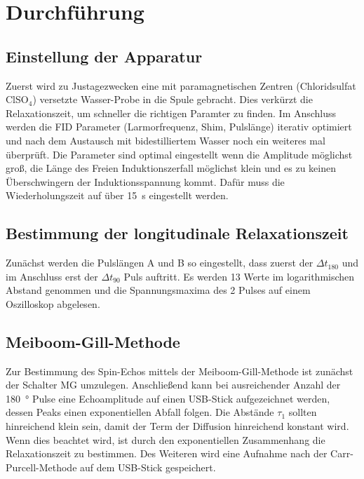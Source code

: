 \section{Durchführung}%
\label{sec:durchfuehrung}

\subsection{Einstellung der Apparatur}%
\label{sub:einstellung_der_apparatur}

Zuerst wird zu Justagezwecken eine mit paramagnetischen Zentren (Chloridsulfat
ClSO$_4$) versetzte Wasser-Probe in die Spule gebracht.
Dies verkürzt die Relaxationszeit, um schneller die richtigen Paramter zu finden. 
Im Anschluss werden die FID Parameter (Larmorfrequenz, Shim, Pulslänge) iterativ optimiert und nach dem Austausch
mit bidestilliertem Wasser noch ein weiteres mal überprüft. 
Die Parameter sind optimal eingestellt wenn die Amplitude möglichst groß, die
Länge des Freien Induktionszerfall möglichst klein und es zu keinen
Überschwingern der Induktionsspannung kommt.
Dafür muss die Wiederholungszeit auf über \SI{15}{\second} eingestellt werden.

\subsection{Bestimmung der longitudinale Relaxationszeit}%
\label{sub:bestimmung_der_longitudinale_relaxationszeit}
Zunächst werden die Pulslängen A und B so eingestellt, dass zuerst der 
$\Delta t_{180}$ und im Anschluss erst der $\Delta t_{90}$ Puls auftritt. 
Es werden 13 Werte im logarithmischen Abstand genommen und die
Spannungsmaxima des 2 Pulses auf einem Oszilloskop abgelesen.

\subsection{Meiboom-Gill-Methode}%
\label{sub:meiboom_gill_methode}
Zur Bestimmung des Spin-Echos mittels der Meiboom-Gill-Methode ist zunächst der
Schalter MG umzulegen. Anschließend kann bei ausreichender Anzahl der \SI{180}{\degree}
Pulse eine Echoamplitude auf einen USB-Stick aufgezeichnet werden, dessen Peaks einen
exponentiellen Abfall folgen. 
Die Abstände $\tau_1$ sollten hinreichend klein sein, damit der Term der
Diffusion hinreichend konstant wird.
Wenn dies beachtet wird, ist durch den exponentiellen Zusammenhang die
Relaxationszeit zu bestimmen. 
Des Weiteren wird eine Aufnahme nach der Carr-Purcell-Methode auf
dem USB-Stick gespeichert.

